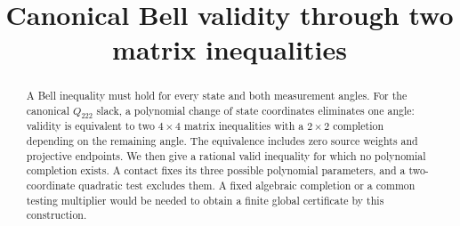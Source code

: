 \documentclass[11pt]{article}
\title{Canonical Bell validity through two matrix inequalities}
\author{}
\date{}
\begin{document}
\maketitle
\vspace{-2em}
\begin{abstract}
A Bell inequality must hold for every state and both measurement angles.
For the canonical $Q_{222}$ slack, a polynomial change of state coordinates
eliminates one angle: validity is equivalent to two $4\times4$ matrix
inequalities with a $2\times2$ completion depending on the remaining angle.
The equivalence includes zero source weights and projective endpoints.
We then give a rational valid inequality for which no polynomial completion
exists. A contact fixes its three possible polynomial parameters, and a
two-coordinate quadratic test excludes them. A fixed algebraic completion or a
common testing multiplier would be needed to obtain a finite global
certificate by this construction.
\end{abstract}
\end{document}
